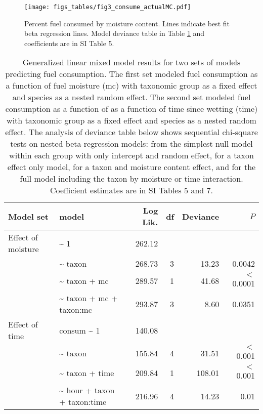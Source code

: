\documentclass[letterpaper,12pt]{article}
\begin{document}
\begin{figure}[h]
  \centering
\texttt{[image: figs\_tables/fig3\_consume\_actualMC.pdf]}
\caption{Percent fuel consumed by moisture content. Lines indicate best fit
  beta regression lines. Model deviance table in Table \ref{tab:consume_anova}
  and coefficients are in SI Table 5.}
  \label{fig:consume_moist}
\end{figure}


\begin{table}[h]
  \caption{Generalized linear mixed model results for two sets of models
    predicting fuel consumption. The first set modeled fuel consumption as a
    function of fuel moisture (mc) with taxonomic group as a fixed effect and
    species as a nested random effect. The second set modeled fuel consumption
    as a function of as a function of time since wetting (time) with taxonomic
    group as a fixed effect and species as a nested random effect. The analysis
    of deviance table below shows sequential chi-square tests on nested beta
    regression models: from the simplest null model within each group with only
    intercept and random effect, for a taxon effect only model, for a taxon and
    moisture content effect, and for the full model including the taxon by
    moisture or time interaction. Coefficient estimates are in SI Tables 5 and
    7.}
  \label{tab:consume_anova}
  \centering

  \begin{tabular}{llrrrr}
\toprule
Model set & model & Log Lik. & df & Deviance & $P$ \\ 
\midrule
  Effect of moisture &   \~{} 1 & 262.12 &  &  &  \\ 
   &  \~{} taxon & 268.73 & 3 & 13.23 & 0.0042 \\ 
   & \~{} taxon + mc & 289.57 & 1 & 41.68 & $<$ 0.0001 \\ 
   & \~{} taxon + mc + taxon:mc & 293.87 & 3 & 8.60 & 0.0351 \\ 
\midrule
Effect of time &  consum \~{} 1 & 140.08 &  &  &  \\ 
 & \~{} taxon & 155.84 & 4 & 31.51 & $<$ 0.001 \\ 
 & \~{} taxon + time & 209.84 & 1 & 108.01 & $<$ 0.001 \\ 
 & \~{} hour + taxon + taxon:time & 216.96 & 4 & 14.23 & 0.01 \\ 
    \bottomrule
    \end{tabular}
\end{table}
\end{document}

